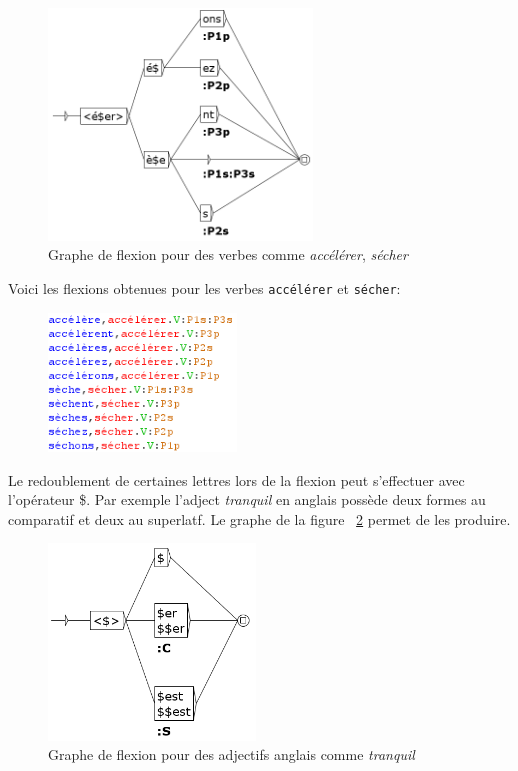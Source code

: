 \begin{figure}[!ht]
\begin{center}
\includegraphics[width=7cm]{resources/img/fig3-Advanced_operators_with_Variables-V_secher.png}
\caption{Graphe de flexion pour des verbes comme {\it accélérer}, {\it sécher}
\label{fig-inflection-secher}}
\end{center}
\end{figure}

\newpage
\noindent
Voici les flexions obtenues pour les verbes \verb+accélérer+ et \verb+sécher+:

\begin{figure}[!ht]
\begin{center}
\includegraphics[width=5cm]{resources/img/fig3-flexion_secher.png}
\end{center}
\end{figure}

\bigskip
\noindent
Le redoublement de certaines lettres lors de la flexion peut s'effectuer avec l'opérateur \$.
Par exemple l'adject {\it tranquil} en anglais possède deux formes au comparatif et deux au
superlatf. Le graphe de la figure ~\ref{fig-inflection-tranquil} permet de les produire.

\bigskip
\begin{figure}[!ht]
\begin{center}
\includegraphics[width=5.5cm]{resources/img/fig3-Advanced_operators_with_Variables-A_tranquil.png}
\caption{Graphe de flexion pour des adjectifs anglais comme {\it tranquil}
\label{fig-inflection-tranquil}}
\end{center}
\end{figure}

